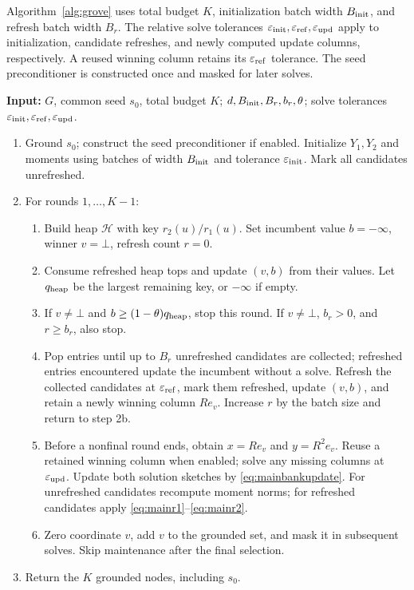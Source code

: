 Algorithm~\ref{alg:grove} uses total budget $K$, initialization
batch width $B_{\rm init}$, and refresh batch width $B_r$.
The relative solve tolerances $\varepsilon_{\rm init},\varepsilon_{\rm ref},\varepsilon_{\rm upd}$ apply to
initialization, candidate refreshes, and newly computed update columns,
respectively. A reused winning column retains its $\varepsilon_{\rm ref}$ tolerance.
The seed preconditioner is constructed once and masked for later solves.

\begin{algorithm}[t]
\caption{\alg{}: hard-CFCC hybrid selection}\label{alg:grove}
\footnotesize
\textbf{Input:} $G$, common seed $s_0$, total budget $K$;
$d,B_{\rm init},B_r,b_r,\theta$; solve tolerances $\varepsilon_{\rm init},\varepsilon_{\rm ref},\varepsilon_{\rm upd}$.
\begin{enumerate}[leftmargin=1.8em,label=\arabic*.,itemsep=1pt,topsep=2pt]
\item Ground $s_0$; construct the seed preconditioner if enabled.
Initialize $Y_1,Y_2$ and moments using batches of width $B_{\rm init}$
and tolerance $\varepsilon_{\rm init}$. Mark all candidates unrefreshed.
\item For rounds $1,\ldots,K-1$:
\begin{enumerate}[leftmargin=1.5em,label=\alph*.,itemsep=1pt,topsep=1pt]
\item Build heap $\mathcal H$ with key $r_2(u)/r_1(u)$.
Set incumbent value $b=-\infty$, winner $v=\bot$, refresh count $r=0$.
\item Consume refreshed heap tops and update $(v,b)$ from their values.
Let $q_{\rm heap}$ be the largest remaining key, or $-\infty$ if empty.
\item If $v\ne\bot$ and $b\geq(1-\theta)q_{\rm heap}$, stop this round.
If $v\ne\bot$, $b_r>0$, and $r\geq b_r$, also stop.
\item Pop entries until up to $B_r$ unrefreshed candidates are collected;
refreshed entries encountered update the incumbent without a solve.
Refresh the collected candidates at $\varepsilon_{\rm ref}$, mark them refreshed,
update $(v,b)$, and retain a newly winning column $Re_v$.
Increase $r$ by the batch size and return to step 2b.
\item Before a nonfinal round ends, obtain $x=Re_v$ and $y=R^2e_v$.
Reuse a retained winning column when enabled; solve any missing
columns at $\varepsilon_{\rm upd}$.
Update both solution sketches by \eqref{eq:mainbankupdate}.
For unrefreshed candidates recompute moment norms; for refreshed
candidates apply \eqref{eq:mainr1}--\eqref{eq:mainr2}.
\item Zero coordinate $v$, add $v$ to the grounded set, and mask it
in subsequent solves. Skip maintenance after the final selection.
\end{enumerate}
\item Return the $K$ grounded nodes, including $s_0$.
\end{enumerate}
\end{algorithm}

